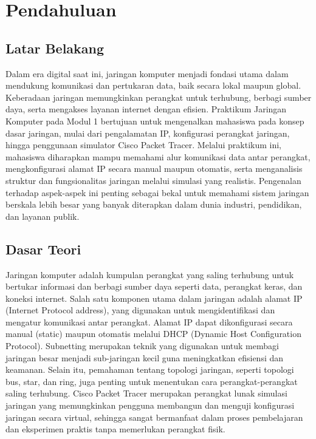 \section{Pendahuluan}
\subsection{Latar Belakang}
Dalam era digital saat ini, jaringan komputer menjadi fondasi utama dalam mendukung komunikasi dan pertukaran data, baik secara lokal maupun global. Keberadaan jaringan memungkinkan perangkat untuk terhubung, berbagi sumber daya, serta mengakses layanan internet dengan efisien. Praktikum Jaringan Komputer pada Modul 1 bertujuan untuk mengenalkan mahasiswa pada konsep dasar jaringan, mulai dari pengalamatan IP, konfigurasi perangkat jaringan, hingga penggunaan simulator Cisco Packet Tracer. Melalui praktikum ini, mahasiswa diharapkan mampu memahami alur komunikasi data antar perangkat, mengkonfigurasi alamat IP secara manual maupun otomatis, serta menganalisis struktur dan fungsionalitas jaringan melalui simulasi yang realistis. Pengenalan terhadap aspek-aspek ini penting sebagai bekal untuk memahami sistem jaringan berskala lebih besar yang banyak diterapkan dalam dunia industri, pendidikan, dan layanan publik.

\subsection{Dasar Teori}
Jaringan komputer adalah kumpulan perangkat yang saling terhubung untuk bertukar informasi dan berbagi sumber daya seperti data, perangkat keras, dan koneksi internet. Salah satu komponen utama dalam jaringan adalah alamat IP (Internet Protocol address), yang digunakan untuk mengidentifikasi dan mengatur komunikasi antar perangkat. Alamat IP dapat dikonfigurasi secara manual (static) maupun otomatis melalui DHCP (Dynamic Host Configuration Protocol). Subnetting merupakan teknik yang digunakan untuk membagi jaringan besar menjadi sub-jaringan kecil guna meningkatkan efisiensi dan keamanan. Selain itu, pemahaman tentang topologi jaringan, seperti topologi bus, star, dan ring, juga penting untuk menentukan cara perangkat-perangkat saling terhubung. Cisco Packet Tracer merupakan perangkat lunak simulasi jaringan yang memungkinkan pengguna membangun dan menguji konfigurasi jaringan secara virtual, sehingga sangat bermanfaat dalam proses pembelajaran dan eksperimen praktis tanpa memerlukan perangkat fisik.

